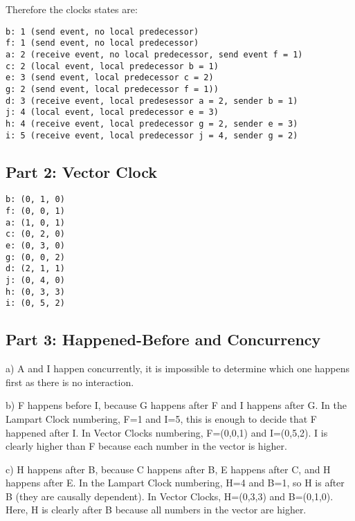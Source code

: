 \documentclass[a4paper]{article}
\begin{document}
Therefore the clocks states are:

\begin{lstlisting}
b: 1 (send event, no local predecessor)
f: 1 (send event, no local predecessor)
a: 2 (receive event, no local predecessor, send event f = 1)
c: 2 (local event, local predecessor b = 1)
e: 3 (send event, local predecessor c = 2)
g: 2 (send event, local predecessor f = 1))
d: 3 (receive event, local predesessor a = 2, sender b = 1)
j: 4 (local event, local predecessor e = 3)
h: 4 (receive event, local predecessor g = 2, sender e = 3)
i: 5 (receive event, local predecessor j = 4, sender g = 2)
\end{lstlisting}

\subsection{Part 2: Vector Clock}

\begin{lstlisting}
b: (0, 1, 0)
f: (0, 0, 1)
a: (1, 0, 1)
c: (0, 2, 0)
e: (0, 3, 0)
g: (0, 0, 2)
d: (2, 1, 1)
j: (0, 4, 0)
h: (0, 3, 3)
i: (0, 5, 2)
\end{lstlisting}

\subsection{Part 3: Happened-Before and Concurrency}

a) A and I happen concurrently, it is impossible to determine which one happens first as there is no interaction.

b) F happens before I, because G happens after F and I happens after G. In the Lampart Clock numbering, F=1 and I=5, this is enough to decide that F happened after I. In Vector Clocks numbering, F=(0,0,1) and I=(0,5,2). I is clearly higher than F because each number in the vector is higher.

c) H happens after B, because C happens after B, E happens after C, and H happens after E. In the Lampart Clock numbering, H=4 and B=1, so H is after B (they are causally dependent). In Vector Clocks, H=(0,3,3) and B=(0,1,0). Here, H is clearly after B because all numbers in the vector are higher.
\end{document}
